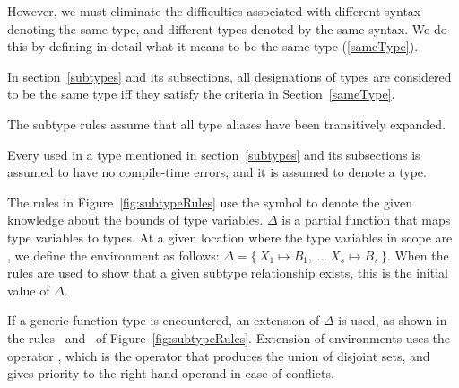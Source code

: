 \documentclass[makeidx]{article}
\begin{document}
{{  However, we must eliminate the difficulties associated with
  different syntax denoting the same type,
  and different types denoted by the same syntax.
  We do this by defining in detail what it means to be the same type
  (\ref{sameType}).%
}

\LMHash{}%
In section~\ref{subtypes} and its subsections,
all designations of types are considered to be the same
type if{}f they satisfy the criteria in
Section~\ref{sameType}.

\LMHash{}%
The subtype rules assume that all type aliases have been transitively expanded.

\LMHash{}%
Every  used in a type mentioned
in section~\ref{subtypes} and its subsections
is assumed to have no compile-time errors,
and it is assumed to denote a type.


\LMHash{}%
The rules in Figure~\ref{fig:subtypeRules} use
the symbol \Index{$\Delta$} to denote the given knowledge about the
bounds of type variables.
$\Delta$ is a partial function that maps type variables to types.
At a given location where the type variables in scope are
\TypeParametersStd{}
,
we define the environment as follows:
$\Delta = \{\,X_1 \mapsto B_1,\ \ldots\ X_s \mapsto B_s\,\}$.
When the rules are used to show that a given subtype relationship exists,
this is the initial value of $\Delta$.

\LMHash{}%
If a generic function type is encountered, an extension of $\Delta$ is used,
as shown in the rules~\SrnPositionalFunctionType{}
and~\SrnNamedFunctionType{}
of Figure~\ref{fig:subtypeRules}.
Extension of environments uses the operator \Index{$\uplus$},
which is the operator that produces the union of disjoint sets,
and gives priority to the right hand operand in case of conflicts.

}
\end{document}
